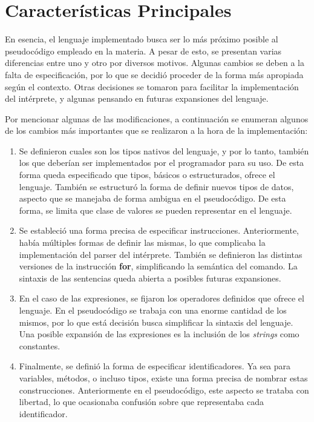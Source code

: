 \documentclass{article}
\begin{document}
\section{Características Principales}

En esencia, el lenguaje implementado busca ser lo más próximo posible al pseudocódigo empleado en la materia.
A pesar de esto, se presentan varias diferencias entre uno y otro por diversos motivos.
Algunas cambios se deben a la falta de especificación, por lo que se decidió proceder de la forma más apropiada según el contexto.
Otras decisiones se tomaron para facilitar la implementación del intérprete, y algunas pensando en futuras expansiones del lenguaje.

Por mencionar algunas de las modificaciones, a continuación se enumeran algunos de los cambios más importantes que se realizaron a la hora de la implementación:

\begin{enumerate}

\item
Se definieron cuales son los tipos nativos del lenguaje, y por lo tanto, también los que deberían ser implementados por el programador para su uso.
De esta forma queda especificado que tipos, básicos o estructurados, ofrece el lenguaje.
También se estructuró la forma de definir nuevos tipos de datos, aspecto que se manejaba de forma ambigua en el pseudocódigo.
De esta forma, se limita que clase de valores se pueden representar en el lenguaje.

\item
Se estableció una forma precisa de especificar instrucciones.
Anteriormente, había múltiples formas de definir las mismas, lo que complicaba la implementación del parser del intérprete.
También se definieron las distintas versiones de la instrucción \textbf{for}, simplificando la semántica del comando.
La sintaxis de las sentencias queda abierta a posibles futuras expansiones.

\item
En el caso de las expresiones, se fijaron los operadores definidos que ofrece el lenguaje.
En el pseudocódigo se trabaja con una enorme cantidad de los mismos, por lo que está decisión busca simplificar la sintaxis del lenguaje.
Una posible expansión de las expresiones es la inclusión de los \textit{strings} como constantes.

\item
Finalmente, se definió la forma de especificar identificadores. Ya sea para variables, métodos, o incluso tipos, existe una forma precisa de nombrar estas construcciones.
Anteriormente en el pseudocódigo, este aspecto se trataba con libertad, lo que ocasionaba confusión sobre que representaba cada identificador.

\end{enumerate}
\end{document}
